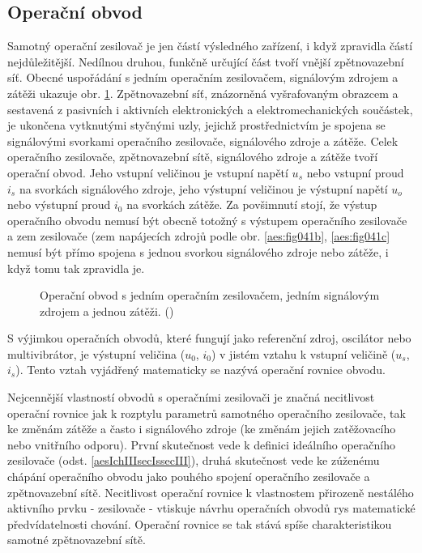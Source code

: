     \subsection{Operační obvod}\label{aesIchIIIsecIssecII} 
      Samotný operační zesilovač je jen částí výsledného zařízení, i když zpravidla částí
      nejdůležitější. Nedílnou druhou, funkčně určující část tvoří vnější zpětnovazební síť. Obecné
      uspořádání s jedním operačním zesilovačem, signálovým zdrojem a zátěži ukazuje obr.
      \ref{aes:fig045}. Zpětnovazební síť, znázorněná vyšrafovaným obrazcem a sestavená z pasivních
      i aktivních elektronických a elektromechanických součástek, je ukončena vytknutými styčnými
      uzly, jejichž prostřednictvím je spojena se signálovými svorkami operačního zesilovače,
      signálového zdroje a zátěže. Celek operačního zesilovače, zpětnovazební sítě, signálového
      zdroje a zátěže tvoří operační obvod. Jeho vstupní veličinou je vstupní napětí \(u_s\) nebo
      vstupní proud \(i_s\) na svorkách signálového zdroje, jeho výstupní veličinou je výstupní
      napětí \(u_o\) nebo výstupní proud \(i_0\) na svorkách zátěže. Za povšimnutí stojí, že výstup
      operačního obvodu nemusí být obecně totožný s výstupem operačního zesilovače a zem zesilovače
      (zem napájecích zdrojů podle obr. \ref{aes:fig041b}, \ref{aes:fig041c} nemusí být přímo
      spojena s jednou svorkou signálového zdroje nebo zátěže, i když tomu tak zpravidla je.
      \begin{figure}[ht!] %
        \centering
        \caption{Operační obvod s jedním operačním zesilovačem, jedním signálovým zdrojem a jednou 
                 zátěži. (\cite[s.~8]{Dostal})}
        \label{aes:fig045}
      \end{figure}

      S výjimkou operačních obvodů, které fungují jako referenční zdroj, oscilátor nebo
      multivibrátor, je výstupní veličina (\(u_0\), \(i_0\)) v jistém vztahu k vstupní veličině
      (\(u_s\), \(i_s\)). Tento vztah vyjádřený matematicky se nazývá operační rovnice obvodu.

      Nejcennější vlastností obvodů s operačními zesilovači je značná necitlivost operační rovnice
      jak k rozptylu parametrů samotného operačního zesilovače, tak ke změnám zátěže a často i
      signálového zdroje (ke změnám jejich zatěžovacího nebo vnitřního odporu). První skutečnost
      vede k definici ideálního operačního zesilovače (odst. \ref{aesIchIIIsecIssecIII}), druhá
      skutečnost vede ke zúženému chápání operačního obvodu jako pouhého spojení operačního
      zesilovače a zpětnovazební sítě. Necitlivost operační rovnice k vlastnostem přirozeně
      nestálého aktivního prvku - zesilovače - vtiskuje návrhu operačních obvodů rys matematické
      předvídatelnosti chování. Operační rovnice se tak stává spíše charakteristikou samotné
      zpětnovazební sítě.

